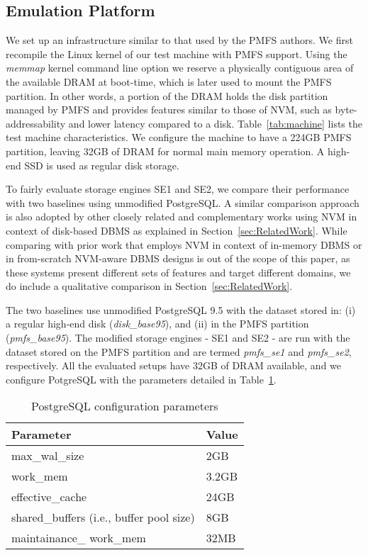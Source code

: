 \subsection{Emulation Platform}

We set up an infrastructure similar to that used by the PMFS authors. We first recompile the Linux kernel of our 
test machine with PMFS support. Using the \textit{memmap} kernel command line option we reserve a physically contiguous area of the 
available DRAM at boot-time, which is later used to mount the PMFS partition. In other words, a portion of the DRAM holds the disk 
partition managed by PMFS and provides features similar to those of NVM, such as byte-addressability and lower latency compared to a disk. 
Table~\ref{tab:machine} lists the test machine characteristics. We configure the machine to have a 224GB PMFS partition, leaving 32GB of 
DRAM for normal main memory operation. A high-end SSD is used as regular disk storage.

To fairly evaluate storage engines SE1 and SE2, we compare their performance with two baselines using unmodified PostgreSQL. A similar comparison approach is also adopted by other closely related and complementary works \cite{gao2011pcmlogging,son2017log} using NVM in context of disk-based DBMS as explained in Section~\ref{sec:RelatedWork}.
While comparing with prior work that employs NVM in context of in-memory
DBMS or in from-scratch NVM-aware DBMS designs is out of the scope of this paper, as these systems present different sets of features and target different domains, we do include a qualitative comparison in Section~\ref{sec:RelatedWork}.

The two baselines use unmodified  PostgreSQL 9.5 with the dataset stored in: (i) a regular high-end disk (\textit{disk\_base95}), and (ii) in the PMFS partition (\textit{pmfs\_base95}). The modified storage engines - SE1 and SE2 - are run with the dataset stored on the PMFS partition and are termed \textit{pmfs\_se1} and \textit{pmfs\_se2}, respectively. All the evaluated setups have 32GB of DRAM available, and we configure PotgreSQL with the parameters detailed in Table~\ref{ParamTable}.

\begin{table}[h]
  \caption{PostgreSQL configuration parameters}
  \label{ParamTable}
  \begin{tabular}{@{}ll@{}}
  \toprule
  \textbf{Parameter} & \textbf{Value} \\ 
  \midrule
  
  max\_wal\_size                        				& 2GB\\
  work\_mem                             				& 3.2GB\\
  effective\_cache								& 24GB\\
  shared\_buffers (i.e., buffer pool size)		& 8GB\\
  maintainance\_ work\_mem					& 32MB\\
   
  \bottomrule
  \end{tabular}
\end{table}

